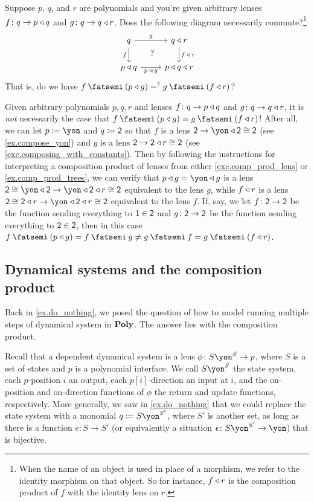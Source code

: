 \documentclass[Book-Poly]{subfiles}
\begin{document}
\begin{exercise}
Suppose $p$, $q$, and $r$ are polynomials and you're given arbitrary lenses $f\colon q\to p\mathbin{\triangleleft} q$ and $g\colon q\to q\mathbin{\triangleleft} r$. Does the following diagram necessarily commute?\footnote{When the name of an object is used in place of a morphism, we refer to the identity morphism on that object.
So for instance, $f\mathbin{\triangleleft} r$ is the composition product of $f$ with the identity lens on $r$.}
\[
\begin{tikzcd}
	q\ar[r, "g"]\ar[d, "f"']&
	q\tri r\ar[d, "f\:\tri\:r"]\\
	p\tri q\ar[r, "p\:\tri\:g"']&
	p\tri q\tri r\ar[ul, phantom, "?"]
\end{tikzcd}
\]
That is, do we have $f\then (p\tri g)=^?g\then (f\tri r)$?
\begin{solution}
Given arbitrary polynomials $p,q,r$ and lenses $f\colon q\to p\mathbin{\triangleleft} q$ and $g\colon q\to q\mathbin{\triangleleft} r$, it is \emph{not} necessarily the case that $f\then (p\tri g)=g\then (f\tri r)$!
After all, we can let $p\coloneqq\yon$ and $q\coloneqq\textsf{2}$ so that $f$ is a lens $\2\to\yon\tri\2\iso\2$ (see \cref{ex.compose_yon}) and $g$ is a lens $\textsf{2}\to\textsf{2}\mathbin{\triangleleft} r\cong\textsf{2}$ (see \cref{exc.composing_with_constants}).
Then by following the instructions for interpreting a composition product of lenses from either \cref{exc.comp_prod_lens} or \cref{ex.comp_prod_trees}, we can verify that $p\tri g=\yon\tri g$ is a lens $\2\iso\yon\tri\2\to\yon\tri\2\tri r\iso\2$ equivalent to the lens $g$, while $f\mathbin{\triangleleft} r$ is a lens $\2\iso\2\tri r\to\yon\tri\2\tri r\iso\2$ equivalent to the lens $f$.
If, say, we let $f\colon\textsf{2}\to\textsf{2}$ be the function sending everything to $1\in\textsf{2}$ and $g\colon\textsf{2}\to\textsf{2}$ be the function sending everything to $2\in\textsf{2}$, then in this case $f\then (p\tri g)=f\then g\neq g\then f=g\then (f\tri r)$.
\end{solution}
\end{exercise}

\subsection{Dynamical systems and the composition product} \label{subsec.comon.comp.def.dyn_sys}

Back in \cref{ex.do_nothing}, we posed the question of how to model running multiple steps of dynamical system in $\mathbf{Poly}$.
The answer lies with the composition product.

Recall that a dependent dynamical system is a lens $\phi\colon S\yon^S\to p$, where $S$ is a set of states and $p$ is a polynomial interface.
We call $S\yon^S$ the state system, each $p$-position $i$ an output, each $p[i]$-direction an input at $i$, and the on-position and on-direction functions of $\phi$ the return and update functions, respectively.
More generally, we saw in \cref{ex.do_nothing} that we could replace the state system with a monomial $q\coloneqq S\yon^{S'}$, where $S'$ is another set, as long as there is a function $e\colon S\to S'$ (or equivalently a situation $\epsilon\colon S\yon^{S'}\to\yon$) that is bijective.
\end{document}
